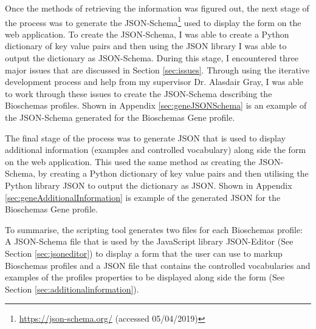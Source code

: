 Once the methods of retrieving the information was figured out, the next stage of the process was to generate the JSON-Schema\footnote{\url{https://json-schema.org/} (accessed 05/04/2019)} used to display the form on the web application. To create the JSON-Schema, I was able to create a Python dictionary of key value pairs and then using the JSON library I was able to output the dictionary as JSON-Schema. During this stage, I encountered three major issues that are discussed in Section \ref{sec:issues}. Through using the iterative development process and help from my supervisor Dr. Alasdair Gray, I was able to work through these issues to create the JSON-Schema describing the Bioschemas profiles. Shown in Appendix \ref{sec:geneJSONSchema} is an example of the JSON-Schema generated for the Bioschemas Gene profile.

The final stage of the process was to generate JSON that is used to display additional information (examples and controlled vocabulary) along side the form on the web application. This used the same method as creating the JSON-Schema, by creating a Python dictionary of key value pairs and then utilising the Python library JSON to output the dictionary as JSON. Shown in Appendix \ref{sec:geneAdditionalInformation} is example of the generated JSON for the Bioschemas Gene profile.

To summarise, the scripting tool generates two files for each Bioschemas profile: A JSON-Schema file that is used by the JavaScript library JSON-Editor (See Section \ref{sec:jsoneditor}) to display a form that the user can use to markup Bioschemas profiles and a JSON file that contains the controlled vocabularies and examples of the profiles properties to be displayed along side the form (See Section \ref{sec:additionalinformation}).


